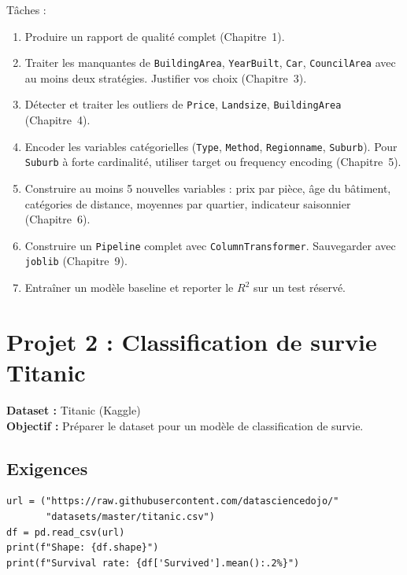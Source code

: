 T\^aches :
\begin{enumerate}
  \item Produire un rapport de qualit\'e complet (Chapitre~1).
  \item Traiter les manquantes de \texttt{BuildingArea}, \texttt{YearBuilt}, \texttt{Car}, \texttt{CouncilArea} avec au moins deux strat\'egies. Justifier vos choix (Chapitre~3).
  \item D\'etecter et traiter les outliers de \texttt{Price}, \texttt{Landsize}, \texttt{BuildingArea} (Chapitre~4).
  \item Encoder les variables cat\'egorielles (\texttt{Type}, \texttt{Method}, \texttt{Regionname}, \texttt{Suburb}). Pour \texttt{Suburb} \`a forte cardinalit\'e, utiliser target ou frequency encoding (Chapitre~5).
  \item Construire au moins 5 nouvelles variables : prix par pi\`ece, \^age du b\^atiment, cat\'egories de distance, moyennes par quartier, indicateur saisonnier (Chapitre~6).
  \item Construire un \texttt{Pipeline} complet avec \texttt{ColumnTransformer}. Sauvegarder avec \texttt{joblib} (Chapitre~9).
  \item Entra\^iner un mod\`ele baseline et reporter le $R^2$ sur un test r\'eserv\'e.
\end{enumerate}

\section{Projet 2 : Classification de survie Titanic}

\textbf{Dataset :} Titanic (Kaggle)\\
\textbf{Objectif :} Pr\'eparer le dataset pour un mod\`ele de classification de survie.

\subsection{Exigences}

\begin{verbatim}
url = ("https://raw.githubusercontent.com/datasciencedojo/"
       "datasets/master/titanic.csv")
df = pd.read_csv(url)
print(f"Shape: {df.shape}")
print(f"Survival rate: {df['Survived'].mean():.2%}")
\end{verbatim}

